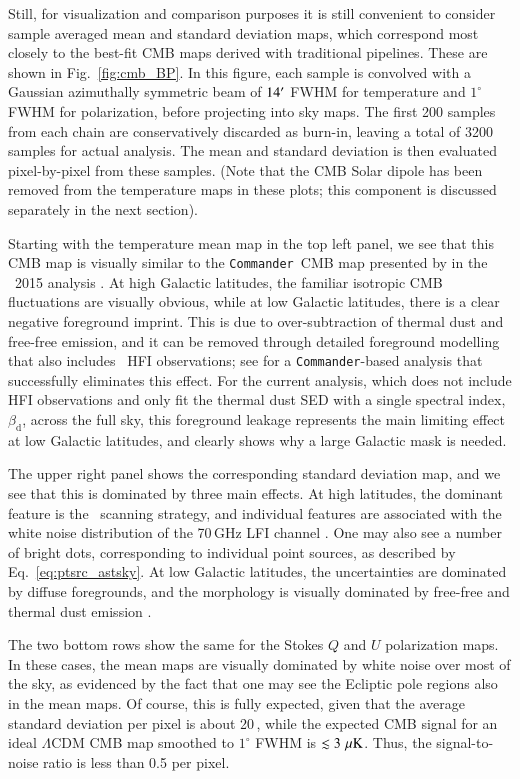 \documentclass[twocolumn]{aa}
\def\commander{\texttt{Commander}}
\begin{document}
Still, for visualization and comparison purposes it is still
convenient to consider sample averaged mean and standard deviation
maps, which correspond most closely to the best-fit CMB maps derived
with traditional pipelines. These are shown in
Fig.~\ref{fig:cmb_BP}. In this figure, each sample is convolved with a
Gaussian azimuthally symmetric beam of $14\arcm$ FWHM for temperature
and $1^{\circ}$ FWHM for polarization, before projecting into sky
maps. The first 200 samples from each chain are conservatively
discarded as burn-in, leaving a total of 3200 samples for actual
analysis. The mean and standard deviation is then evaluated
pixel-by-pixel from these samples. (Note that the CMB Solar dipole has
been removed from the temperature maps in these plots; this component
is discussed separately in the next section).

Starting with the temperature mean map in the top left panel, we see
that this CMB map is visually similar to the \commander\ CMB map
presented by in the \Planck\ 2015 analysis \citep{planck2014-a12}. At
high Galactic latitudes, the familiar isotropic CMB fluctuations are
visually obvious, while at low Galactic latitudes, there is a clear
negative foreground imprint. This is due to over-subtraction of
thermal dust and free-free emission, and it can be removed through
detailed foreground modelling that also includes \Planck\ HFI
observations; see \citet{planck2016-l04} for a \commander-based
analysis that successfully eliminates this effect. For the current
analysis, which does not include HFI observations and only fit the
thermal dust SED with a single spectral index, $\beta_{\mathrm{d}}$,
across the full sky, this foreground leakage represents the main
limiting effect at low Galactic latitudes, and clearly shows why a
large Galactic mask is needed.

The upper right panel shows the corresponding standard deviation map,
and we see that this is dominated by three main effects. At high
latitudes, the dominant feature is the \Planck\ scanning strategy, and
individual features are associated with the white
noise distribution of the 70\,GHz LFI channel \citep{bp10}. One may
also see a number of bright dots, corresponding to individual point
sources, as described by Eq.~\eqref{eq:ptsrc_astsky}. At low Galactic
latitudes, the uncertainties are dominated by diffuse foregrounds, and
the morphology is visually dominated by free-free and thermal dust
emission \citep{bp13}.

The two bottom rows show the same for the Stokes $Q$ and $U$
polarization maps. In these cases, the mean maps are visually
dominated by white noise over most of the sky, as evidenced by the
fact that one may see the Ecliptic pole regions also in the mean
maps. Of course, this is fully expected, given that the average
standard deviation per pixel is about 20\,\muK, while the expected CMB
signal for an ideal $\Lambda$CDM CMB map smoothed to $1^{\circ}$ FWHM
is $\lesssim3\,\muK$. Thus, the signal-to-noise ratio is less than 0.5
per pixel.
\end{document}

